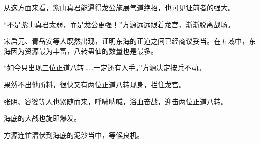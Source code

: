 \begin{this_body}
从这方面来看，紫山真君能逼得龙公施展气道绝招，也可见证前者的强大。

“不是紫山真君太弱，而是龙公更强！”方源远远跟着龙宫，渐渐脱离战场。

宋启元、青岳安等人既然出现，证明东海的正道之间已经商议妥当。在五域中，东海因为资源最为丰富，八转蛊仙的数量也是最多。

“如今只出现三位正道八转……一定还有人手。”方源决定按兵不动。

果然不出他所料，很快又有两位正道八转现身，拦住龙宫。

张阴、容婆等人也紧随而来，呼啸呐喊，浴血奋战，迎击两位正道八转。

海底的大战也旋即爆发。

方源连忙潜伏到海底的泥沙当中，等候良机。

\end{this_body}

